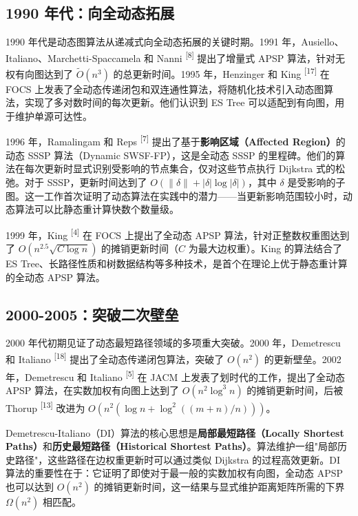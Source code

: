 \documentclass[12pt,a4paper]{ctexart}
\begin{document}
\subsection{1990 年代：向全动态拓展}

1990 年代是动态图算法从递减式向全动态拓展的关键时期。1991 年，Ausiello、Italiano、Marchetti-Spaccamela 和 Nanni \textsuperscript{[8]}  提出了增量式 APSP 算法，针对无权有向图达到了 $\tilde{O}(n^3)$ 的总更新时间。1995 年，Henzinger 和 King \textsuperscript{[17]}  在 FOCS 上发表了全动态传递闭包和双连通性算法，将随机化技术引入动态图算法，实现了多对数时间的每次更新。他们认识到 ES Tree 可以适配到有向图，用于维护单源可达性。

1996 年，Ramalingam 和 Reps \textsuperscript{[7]}  提出了基于\textbf{影响区域（Affected Region）}的动态 SSSP 算法（Dynamic SWSF-FP），这是全动态 SSSP 的里程碑。他们的算法在每次更新时显式识别受影响的节点集合，仅对这些节点执行 Dijkstra 式的松弛。对于 SSSP，更新时间达到了 $O(\|\delta\|+|\delta|\log|\delta|)$，其中 $\delta$ 是受影响的子图。这一工作首次证明了动态算法在实践中的潜力——当更新影响范围较小时，动态算法可以比静态重计算快数个数量级。

1999 年，King \textsuperscript{[4]}  在 FOCS 上提出了全动态 APSP 算法，针对正整数权重图达到了 $O(n^{2.5}\sqrt{C\log n})$ 的摊销更新时间（$C$ 为最大边权重）。King 的算法结合了 ES Tree、长路径性质和树数据结构等多种技术，是首个在理论上优于静态重计算的全动态 APSP 算法。

\subsection{2000-2005：突破二次壁垒}

2000 年代初期见证了动态最短路径领域的多项重大突破。2000 年，Demetrescu 和 Italiano \textsuperscript{[18]}  提出了全动态传递闭包算法，突破了 $O(n^2)$ 的更新壁垒。2002 年，Demetrescu 和 Italiano \textsuperscript{[5]}  在 JACM 上发表了划时代的工作，提出了全动态 APSP 算法，在实数加权有向图上达到了 $O(n^2\log^3 n)$ 的摊销更新时间，后被 Thorup \textsuperscript{[13]}  改进为 $O(n^2(\log n+\log^2((m+n)/n)))$。

Demetrescu-Italiano（DI）算法的核心思想是\textbf{局部最短路径（Locally Shortest Paths）}和\textbf{历史最短路径（Historical Shortest Paths）}。算法维护一组"局部历史路径"，这些路径在边权重更新时可以通过类似 Dijkstra 的过程高效更新。DI 算法的重要性在于：它证明了即使对于最一般的实数加权有向图，全动态 APSP 也可以达到 $O(n^2)$ 的摊销更新时间，这一结果与显式维护距离矩阵所需的下界 $\Omega(n^2)$ 相匹配。
\end{document}
